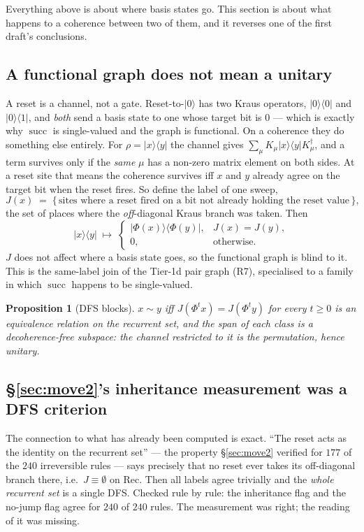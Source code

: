 \documentclass[11pt]{article}
\providecommand{\ket}[1]{|#1\rangle}
\providecommand{\bra}[1]{\langle#1|}
\theoremstyle{plain}
\newtheorem{proposition}{Proposition}
\theoremstyle{definition}
\begin{document}
Everything above is about where basis states go. This section is about what
happens to a coherence between two of them, and it reverses one of the first
draft's conclusions.

\subsection{A functional graph does not mean a unitary}

A reset is a channel, not a gate. Reset-to-$\ket0$ has two Kraus operators,
$\ket0\bra0$ and $\ket0\bra1$, and \emph{both} send a basis state to one whose
target bit is $0$ --- which is exactly why $\operatorname{succ}$ is single-valued
and the graph is functional. On a coherence they do something else entirely. For
$\rho=\ket x\bra y$ the channel gives $\sum_\mu K_\mu\ket x\bra y K_\mu^\dagger$,
and a term survives only if the \emph{same} $\mu$ has a non-zero matrix element on
both sides. At a reset site that means the coherence survives iff $x$ and $y$
already agree on the target bit when the reset fires. So define the label of one
sweep,
\[
J(x) \;=\; \{\,\text{sites where a reset fired on a bit not already holding the
reset value}\,\},
\]
the set of places where the \emph{off}-diagonal Kraus branch was taken. Then
\[
\ket x\bra y \;\longmapsto\;
\begin{cases}
\ket{\Phi(x)}\bra{\Phi(y)}, & J(x)=J(y),\\[2pt]
0, & \text{otherwise.}
\end{cases}
\]
$J$ does not affect where a basis state goes, so the functional graph is blind to
it. This is the same-label join of the Tier-1d pair graph (R7), specialised to a
family in which $\operatorname{succ}$ happens to be single-valued.

\begin{proposition}[DFS blocks]
$x\sim y$ iff $J(\Phi^t x)=J(\Phi^t y)$ for every $t\ge0$ is an equivalence
relation on the recurrent set, and the span of each class is a decoherence-free
subspace: the channel restricted to it is the permutation, hence unitary.
\end{proposition}

\subsection{\S\ref{sec:move2}'s inheritance measurement was a DFS criterion}

The connection to what has already been computed is exact. ``The reset acts as the
identity on the recurrent set'' --- the property \S\ref{sec:move2} verified for
$177$ of the $240$ irreversible rules --- says precisely that no reset ever takes
its off-diagonal branch there, i.e.\ $J\equiv\emptyset$ on $\mathrm{Rec}$. Then
all labels agree trivially and the \emph{whole recurrent set} is a single DFS.
Checked rule by rule: the inheritance flag and the no-jump flag agree for
$240$ of $240$ rules. The measurement was right; the reading of it was missing.
\end{document}
